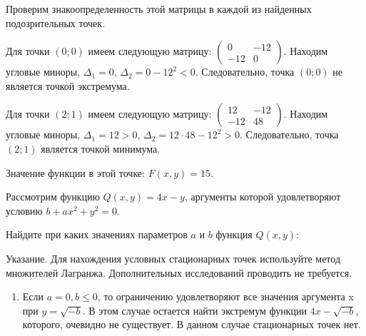 \documentclass[addpoints, answers]{exam} %
\begin{document}
\begin{questions}
\begin{solution}
Проверим знакоопределенность этой матрицы в каждой из найденных подозрительных точек.


Для точки  $(0;0)$ имеем следующую матрицу:  
$\begin{pmatrix}
0 & -12 \\
-12 & 0
\end{pmatrix}$. 
Находим угловые миноры, $\Delta_1=0$, $\Delta_2=0-12^2<0$. Следовательно, точка $(0;0)$  не является точкой экстремума.


Для точки $(2;1)$  имеем следующую матрицу:
$\begin{pmatrix}
12 & -12 \\
-12 & 48
\end{pmatrix}.$  
Находим угловые миноры, $\Delta_1=12>0$, $\Delta_2=12\cdot 48-12^2>0$.  Следовательно, точка $(2;1)$  является точкой минимума.

Значение функции в этой точке: $F(x,y)=15$.
\end{solution}



\question Рассмотрим функцию $Q(x,y)=4x-y$, аргументы которой удовлетворяют условию $b+ax^2+y^2=0$.

Найдите при каких значениях параметров $a$ и $b$  функция $Q(x,y)$:


Указание. Для нахождения условных стационарных точек используйте метод множителей Лагранжа. Дополнительных исследований проводить не требуется. 

\begin{solution}
\begin{enumerate}
\item Если $a=0,b\le 0$, то ограничению удовлетворяют все значения аргумента x при $y=\sqrt{-b} $. В этом случае остается найти экстремум функции $4x-\sqrt{-b} $, которого, очевидно не существует. В данном случае стационарных точек нет. 


\end{enumerate}
\end{solution}
\end{questions}
\end{document}
